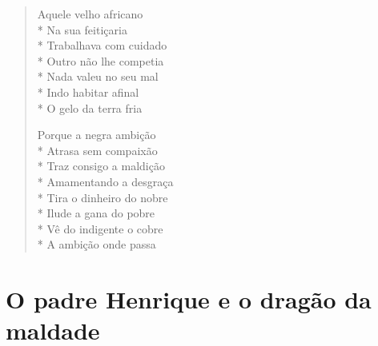 \begin{verse}
Aquele velho africano\\*
Na sua feitiçaria\\*
Trabalhava com cuidado\\*
Outro não lhe competia\\*
Nada valeu no seu mal\\*
Indo habitar afinal\\*
O gelo da terra fria

Porque a negra ambição\\*
Atrasa sem compaixão\\*
Traz consigo a maldição\\*
Amamentando a desgraça\\*
Tira o dinheiro do nobre\\*
Ilude a gana do pobre\\*
Vê do indigente o cobre\\*
A ambição onde passa
\end{verse}

\chapter{O padre Henrique e o dragão da maldade}

